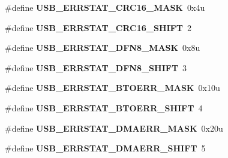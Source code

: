 \begin{DoxyCompactItemize}
\item 
\hypertarget{group___u_s_b___register___masks_gac9682448ca13abab007c9438e811610c}{}\#define {\bfseries U\+S\+B\+\_\+\+E\+R\+R\+S\+T\+A\+T\+\_\+\+C\+R\+C16\+\_\+\+M\+A\+S\+K}~0x4u\label{group___u_s_b___register___masks_gac9682448ca13abab007c9438e811610c}

\item 
\hypertarget{group___u_s_b___register___masks_gaf0bd8a085cd33bc98cf89d6ea726be46}{}\#define {\bfseries U\+S\+B\+\_\+\+E\+R\+R\+S\+T\+A\+T\+\_\+\+C\+R\+C16\+\_\+\+S\+H\+I\+F\+T}~2\label{group___u_s_b___register___masks_gaf0bd8a085cd33bc98cf89d6ea726be46}

\item 
\hypertarget{group___u_s_b___register___masks_gaf2aaf7552c127da34a4252936afe561a}{}\#define {\bfseries U\+S\+B\+\_\+\+E\+R\+R\+S\+T\+A\+T\+\_\+\+D\+F\+N8\+\_\+\+M\+A\+S\+K}~0x8u\label{group___u_s_b___register___masks_gaf2aaf7552c127da34a4252936afe561a}

\item 
\hypertarget{group___u_s_b___register___masks_gae26a3aed245ac0546edc65afaa2c5542}{}\#define {\bfseries U\+S\+B\+\_\+\+E\+R\+R\+S\+T\+A\+T\+\_\+\+D\+F\+N8\+\_\+\+S\+H\+I\+F\+T}~3\label{group___u_s_b___register___masks_gae26a3aed245ac0546edc65afaa2c5542}

\item 
\hypertarget{group___u_s_b___register___masks_ga64f9bd307b556ecbd454571aa2d1b4c8}{}\#define {\bfseries U\+S\+B\+\_\+\+E\+R\+R\+S\+T\+A\+T\+\_\+\+B\+T\+O\+E\+R\+R\+\_\+\+M\+A\+S\+K}~0x10u\label{group___u_s_b___register___masks_ga64f9bd307b556ecbd454571aa2d1b4c8}

\item 
\hypertarget{group___u_s_b___register___masks_gaa6f963350f684e982457839f7bc842e5}{}\#define {\bfseries U\+S\+B\+\_\+\+E\+R\+R\+S\+T\+A\+T\+\_\+\+B\+T\+O\+E\+R\+R\+\_\+\+S\+H\+I\+F\+T}~4\label{group___u_s_b___register___masks_gaa6f963350f684e982457839f7bc842e5}

\item 
\hypertarget{group___u_s_b___register___masks_ga3941bf3fbbca724b3b26a09bb2432581}{}\#define {\bfseries U\+S\+B\+\_\+\+E\+R\+R\+S\+T\+A\+T\+\_\+\+D\+M\+A\+E\+R\+R\+\_\+\+M\+A\+S\+K}~0x20u\label{group___u_s_b___register___masks_ga3941bf3fbbca724b3b26a09bb2432581}

\item 
\hypertarget{group___u_s_b___register___masks_ga2e3f280874ee203f1f801206ab4254be}{}\#define {\bfseries U\+S\+B\+\_\+\+E\+R\+R\+S\+T\+A\+T\+\_\+\+D\+M\+A\+E\+R\+R\+\_\+\+S\+H\+I\+F\+T}~5\label{group___u_s_b___register___masks_ga2e3f280874ee203f1f801206ab4254be}


\end{DoxyCompactItemize}
